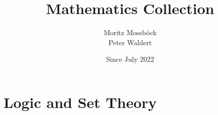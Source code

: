 \documentclass{report}
\author{Moritz Mossböck \\ Peter Waldert}
\title{Mathematics Collection}
\date{Since July 2022}
\begin{document}
    \begin{titlepage}
        \maketitle
    \end{titlepage}


    
    \chapter{Logic and Set Theory}
    
\end{document}
